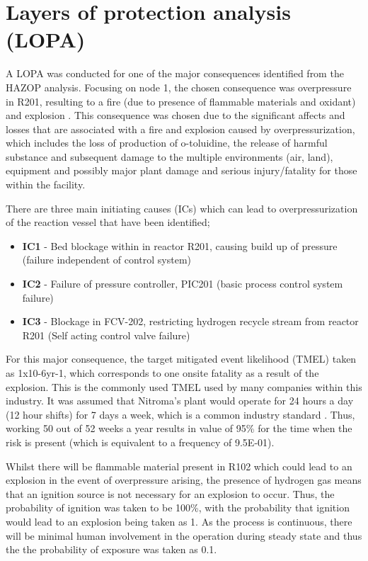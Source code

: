 \section{Layers of protection analysis (LOPA)}

A LOPA was conducted for one of the major consequences identified from the HAZOP analysis. Focusing on node 1, the chosen consequence was overpressure in R201, resulting to a fire (due to presence of flammable materials and oxidant) and explosion . This consequence was chosen due to the significant affects and losses that are associated with a fire and explosion caused by overpressurization, which includes the loss of production of o-toluidine, the release of harmful substance and subsequent damage to the multiple environments (air, land), equipment and possibly major plant damage and serious injury/fatality for those within the facility. 

There are three main initiating causes (ICs) which can lead to overpressurization of the reaction vessel that have been identified;

\begin{itemize}
\item \textbf{IC1} - Bed blockage within in reactor R201, causing build up of pressure (failure independent of control system)
\item \textbf{IC2} - Failure of pressure controller, PIC201 (basic process control system failure)
\item \textbf{IC3 }- Blockage in FCV-202, restricting hydrogen recycle stream from reactor R201 (Self acting control valve failure)

\end{itemize}
 For this major consequence, the target mitigated event likelihood (TMEL) taken as 1x10-6yr-1, which corresponds to one onsite fatality as a result of the explosion. This is the commonly used TMEL used by many companies within this industry. It was assumed that Nitroma's plant would operate for 24 hours a day (12 hour shifts) for 7 days a week, which is a common industry standard \cite{job_guide_chemical_2021}. Thus, working 50 out of 52 weeks a year results in value of 95\% for the time when the risk is present (which is equivalent to a frequency of 9.5E-01).  
 
Whilst there will be flammable material present in R102 which could lead to an explosion in the event of overpressure arising, the presence of hydrogen gas means that an ignition source is not necessary for an explosion to occur. Thus, the probability of ignition was taken to be 100\%, with the probability that ignition would lead to an explosion being taken as 1. As the process is continuous, there will be minimal human involvement in the operation during steady state and thus the the probability of exposure was taken as 0.1. 
 
